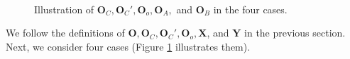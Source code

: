 \documentclass[letterpaper]{article} %
\begin{document}
\begin{figure}[!t]
    \center
    \\
    \caption{Illustration of $\mathbf{O}_C, \mathbf{O}_C', \mathbf{O}_o, \mathbf{O}_A,$ and $\mathbf{O}_B$ in the four cases.} 
    \label{fig:four_cases}
\end{figure}

We follow the definitions of $\mathbf{O}, \mathbf{O}_C, \mathbf{O}_C', \mathbf{O}_o, \mathbf{X}$, and $\mathbf{Y}$ in the previous section.
Next, we consider four cases (Figure \ref{fig:four_cases} illustrates them). 
\end{document}
